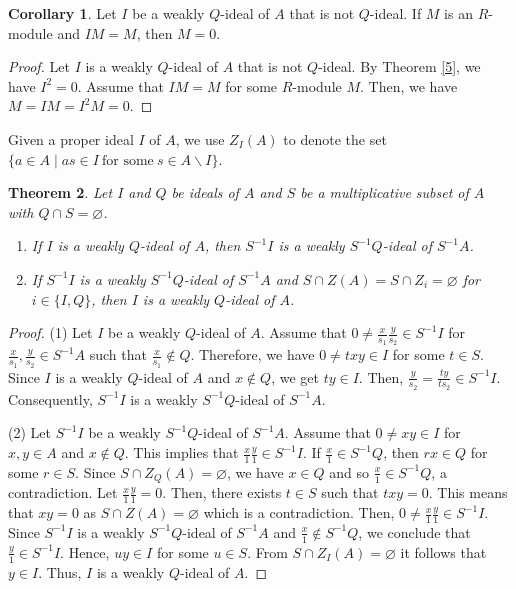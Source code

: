 \documentclass[preprint,review,10pt]{amsart}
\newtheorem{theorem}{Theorem}[section]
\theoremstyle{definition}
\newtheorem{corollary}[theorem]{Corollary}
\theoremstyle{remark}
\numberwithin{equation}{section}
\begin{document}
\begin{corollary} \label{6}
Let   $I$ be a weakly $Q$-ideal of $A$ that is not $Q$-ideal. If $M$ is an $R$-module and $IM=M$, then $M=0$.
\end{corollary}
\begin{proof}
Let $I$ is  a weakly $Q$-ideal of $A$ that is not $Q$-ideal. By  Theorem \ref{5}, we have $I^2=0$. Assume that  $IM=M$ for some $R$-module $M$. Then, we have $M=IM=I^2M=0$.
\end{proof}
Given   a proper ideal $I$ of $A$, we use $Z_I(A)$ to denote  the set $\{a \in A \mid as \in I \  \text{for some} \ s \in A \backslash I\}$.
\begin{theorem} \label{7}
Let $I$ and $Q$ be ideals of $A$ and $S$ be a multiplicative subset of $A$ with $Q \cap S=\varnothing$. 
\begin{enumerate}
\item If $I$ is a weakly $Q$-ideal of $A$, then $S^{-1}I$ is a weakly $S^{-1}Q$-ideal of $S^{-1}A$.
\item If $S^{-1}I$ is a weakly $S^{-1}Q$-ideal of $S^{-1}A$ and $S \cap Z(A)=S \cap Z_i=\varnothing$ for $i \in\{I,Q\}$, then $I$ is a weakly $Q$-ideal of $A$.
\end{enumerate} 
\end{theorem}
\begin{proof}
(1) Let $I$ be a weakly $Q$-ideal of $A$. Assume that $0 \neq \frac{x}{s_1}\frac{y}{s_2} \in S^{-1}I$ for  $\frac{x}{s_1},\frac{y}{s_2} \in S^{-1}A$ such that $\frac{x}{s_1} \notin Q$. Therefore, we have $0 \neq txy \in I$ for some $t \in S$. Since $I$ is a weakly $Q$-ideal of $A$ and $x \notin Q$, we get $ty \in I$. Then, $\frac{y}{s_2}=\frac{ty}{ts_2} \in S^{-1}I$. Consequently,  $S^{-1}I$ is a weakly $S^{-1}Q$-ideal of $S^{-1}A$.

(2) Let  $S^{-1}I$ be a weakly $S^{-1}Q$-ideal of $S^{-1}A$. Assume that $0 \neq xy \in I$ for $x,y \in A$ and $x \notin Q$. This implies that $\frac{x}{1}\frac{y}{1} \in S^{-1}I$. If $\frac{x}{1} \in S^{-1}Q$, then $rx \in Q$ for some $r \in S$. Since  $S \cap Z_Q(A)=\varnothing$, we have  $x \in Q$ and so $\frac{x}{1} \in S^{-1}Q$, a contradiction. Let $\frac{x}{1}\frac{y}{1}=0$. Then, there exists $t \in S$ such that $txy=0$. This means that $xy=0$ as $S \cap Z(A)=\varnothing$ which is a contradiction. Then, $0 \neq \frac{x}{1}\frac{y}{1} \in S^{-1}I$.   Since $S^{-1}I$ is a weakly $S^{-1}Q$-ideal of $S^{-1}A$ and  $\frac{x}{1} \notin  S^{-1}Q$, we conclude that  $\frac{y}{1} \in S^{-1}I$. Hence,  $uy \in I$ for some $u \in S$. From $S\cap Z_I(A)=\varnothing$ it follows that $y \in I$. Thus, $I$ is a weakly $Q$-ideal of $A$.
\end{proof}
\end{document}
